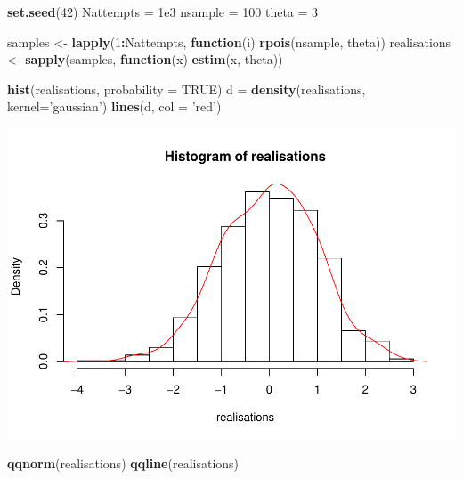 \documentclass[]{article}
\newenvironment{Shaded}{\begin{snugshade}}{\end{snugshade}}
\newcommand{\ControlFlowTok}[1]{\textcolor[rgb]{0.13,0.29,0.53}{\textbf{#1}}}
\newcommand{\DataTypeTok}[1]{\textcolor[rgb]{0.13,0.29,0.53}{#1}}
\newcommand{\DecValTok}[1]{\textcolor[rgb]{0.00,0.00,0.81}{#1}}
\newcommand{\FloatTok}[1]{\textcolor[rgb]{0.00,0.00,0.81}{#1}}
\newcommand{\KeywordTok}[1]{\textcolor[rgb]{0.13,0.29,0.53}{\textbf{#1}}}
\newcommand{\NormalTok}[1]{#1}
\newcommand{\OperatorTok}[1]{\textcolor[rgb]{0.81,0.36,0.00}{\textbf{#1}}}
\newcommand{\OtherTok}[1]{\textcolor[rgb]{0.56,0.35,0.01}{#1}}
\newcommand{\StringTok}[1]{\textcolor[rgb]{0.31,0.60,0.02}{#1}}
\begin{document}
\begin{Shaded}
\begin{Highlighting}[]
\KeywordTok{set.seed}\NormalTok{(}\DecValTok{42}\NormalTok{)}
\NormalTok{Nattempts =}\StringTok{ }\FloatTok{1e3}
\NormalTok{nsample =}\StringTok{ }\DecValTok{100}
\NormalTok{theta =}\StringTok{ }\DecValTok{3}

\NormalTok{samples <-}\StringTok{ }\KeywordTok{lapply}\NormalTok{(}\DecValTok{1}\OperatorTok{:}\NormalTok{Nattempts, }\ControlFlowTok{function}\NormalTok{(i) }\KeywordTok{rpois}\NormalTok{(nsample, theta))}
\NormalTok{realisations <-}\StringTok{ }\KeywordTok{sapply}\NormalTok{(samples, }\ControlFlowTok{function}\NormalTok{(x) }\KeywordTok{estim}\NormalTok{(x, theta))}

\KeywordTok{hist}\NormalTok{(realisations, }\DataTypeTok{probability =} \OtherTok{TRUE}\NormalTok{)}
\NormalTok{d =}\StringTok{ }\KeywordTok{density}\NormalTok{(realisations, }\DataTypeTok{kernel=}\StringTok{'gaussian'}\NormalTok{)}
\KeywordTok{lines}\NormalTok{(d, }\DataTypeTok{col =} \StringTok{'red'}\NormalTok{)}
\end{Highlighting}
\end{Shaded}

\includegraphics{Homework_Adrien_Toulouse_Paul-Antoine_Girard_files/figure-latex/unnamed-chunk-2-1.pdf}

\begin{Shaded}
\begin{Highlighting}[]
\KeywordTok{qqnorm}\NormalTok{(realisations)}
\KeywordTok{qqline}\NormalTok{(realisations)}
\end{Highlighting}
\end{Shaded}
\end{document}

